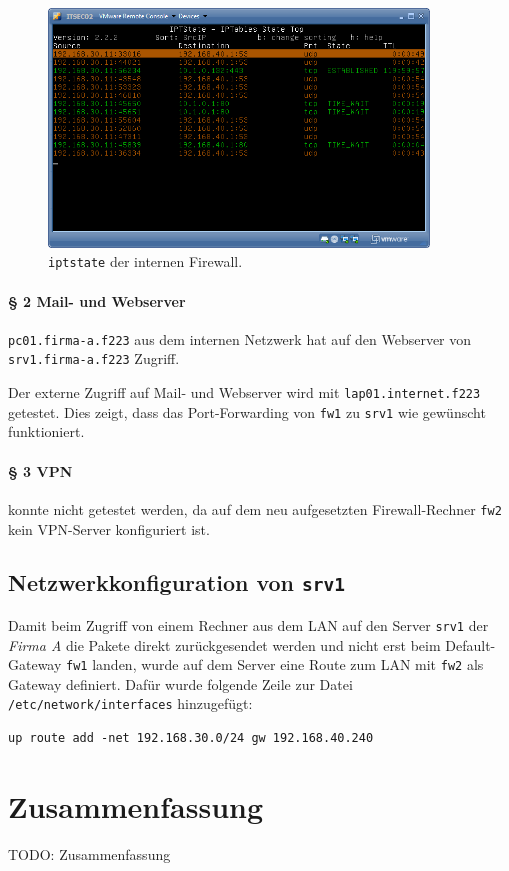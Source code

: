 \begin{figure}[h!]
  \centering
    \includegraphics[width=0.9\textwidth]{figures/iptstate-intern.png}
  \caption{{\tt iptstate} der internen Firewall.}
  \label{fig.iptstate-intern}
\end{figure}


\paragraph{§ 2 Mail- und Webserver}

{\tt pc01.firma-a.f223} aus dem internen Netzwerk hat auf
den Webserver von {\tt srv1.firma-a.f223} Zugriff.

Der externe Zugriff auf Mail- und Webserver wird mit {\tt lap01.internet.f223}
getestet.
Dies zeigt, dass das Port-Forwarding von {\tt fw1} zu {\tt srv1}
wie gewünscht funktioniert.

\paragraph{§ 3 VPN}
konnte nicht getestet werden, da auf dem neu aufgesetzten Firewall-Rechner
{\tt fw2} kein VPN-Server konfiguriert ist.


\subsection{Netzwerkkonfiguration von {\tt srv1}}

Damit beim Zugriff von einem Rechner aus dem LAN auf den Server
{\tt srv1} der \emph{Firma A} die Pakete direkt zurückgesendet werden und nicht
erst beim Default-Gateway {\tt fw1} landen, wurde auf dem
Server eine Route zum LAN mit {\tt fw2} als Gateway definiert.
Dafür wurde folgende Zeile zur Datei {\tt /etc/network/interfaces} hinzugefügt:
\begin{verbatim}
up route add -net 192.168.30.0/24 gw 192.168.40.240
\end{verbatim}


\newpage
\section{Zusammenfassung}

TODO: Zusammenfassung

